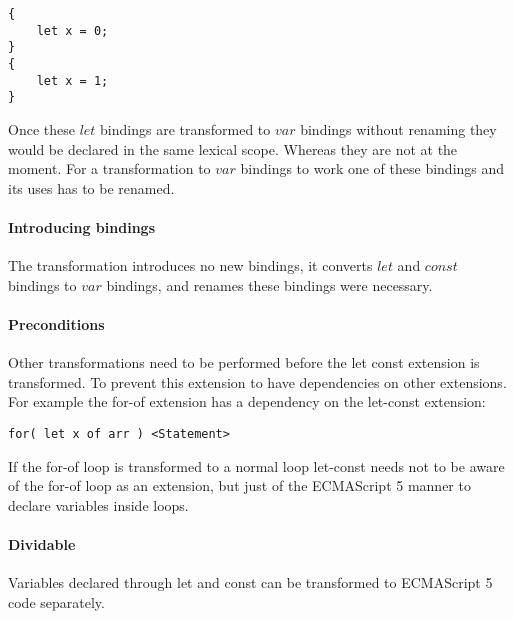 \documentclass[10pt,a4paper]{article}
\begin{document}
\begin{lstlisting}
{
	let x = 0;
}
{
	let x = 1;
}
\end{lstlisting} 

Once these $let$ bindings are transformed to $var$ bindings without renaming they would be declared in the same lexical scope. Whereas they are not at the moment. For a transformation to $var$ bindings to work one of these bindings and its uses has to be renamed.

\paragraph{Introducing bindings}
The transformation introduces no new bindings, it converts $let$ and $const$ bindings to $var$ bindings, and renames these bindings were necessary.

\paragraph{Preconditions}
Other transformations need to be performed before the let const extension is transformed. To prevent this extension to have dependencies on other extensions. For example the for-of extension has a dependency on the let-const extension:

\begin{lstlisting}
for( let x of arr ) <Statement>
\end{lstlisting}

If the for-of loop is transformed to a normal loop let-const needs not to be aware of the for-of loop as an extension, but just of the ECMAScript 5 manner to declare variables inside loops.

\paragraph{Dividable}
Variables declared through let and const can be transformed to ECMAScript 5 code separately.

{}

\end{document}
